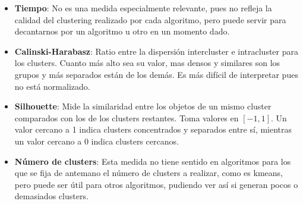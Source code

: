 \begin{itemize}
\item \textbf{Tiempo}: No es una medida especialmente relevante, pues no refleja la calidad del clustering realizado por cada algoritmo, pero puede servir para decantarnos por un algoritmo u otro en un momento dado.
\item \textbf{Calinski-Harabasz}: Ratio entre la dispersión intercluster e intracluster para los clusters. Cuanto más alto sea su valor, mas densos y similares son los grupos y más separados están de los demás. Es más difícil de interpretar pues no está normalizado.
\item \textbf{Silhouette}: Mide la similaridad entre los objetos de un mismo cluster comparados con los de los clusters restantes. Toma valores en $[-1, 1]$. Un valor cercano a 1 indica clusters concentrados y separados entre sí, mientras un valor cercano a 0 indica clusters cercanos.
\item \textbf{Número de clusters}: Esta medida no tiene sentido en algoritmos para los que se fija de antemano el número de clusters a realizar, como es kmeans, pero puede ser útil para otros algoritmos, pudiendo ver así si generan pocos o demasiados clusters.  
\end{itemize}

